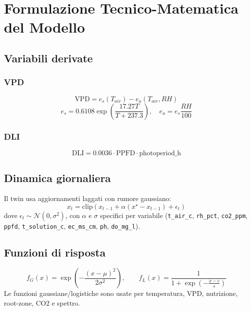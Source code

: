 ﻿\documentclass[11pt,a4paper]{report}
\begin{document}
\newpage
\chapter{Formulazione Tecnico-Matematica del Modello}

\section{Variabili derivate}
\subsection*{VPD}
\begin{equation}
\mathrm{VPD} = e_s(T_{air}) - e_a(T_{air}, RH)
\end{equation}
\begin{equation}
e_s = 0.6108\exp\left(\frac{17.27T}{T+237.3}\right), \quad e_a = e_s\frac{RH}{100}
\end{equation}

\subsection*{DLI}
\begin{equation}
\mathrm{DLI} = 0.0036 \cdot \mathrm{PPFD} \cdot \mathrm{photoperiod\_h}
\end{equation}

\section{Dinamica giornaliera}
Il twin usa aggiornamenti laggati con rumore gaussiano:
\begin{equation}
x_t = \mathrm{clip}(x_{t-1} + \alpha(x^\star - x_{t-1}) + \epsilon_t)
\end{equation}
dove \(\epsilon_t \sim \mathcal{N}(0,\sigma^2)\), con \(\alpha\) e \(\sigma\) specifici per variabile (\texttt{t\_air\_c}, \texttt{rh\_pct}, \texttt{co2\_ppm}, \texttt{ppfd}, \texttt{t\_solution\_c}, \texttt{ec\_ms\_cm}, \texttt{ph}, \texttt{do\_mg\_l}).

\section{Funzioni di risposta}
\begin{equation}
f_G(x)=\exp\left(-\frac{(x-\mu)^2}{2\sigma^2}\right), \qquad
f_L(x)=\frac{1}{1+\exp\left(-\frac{x-c}{s}\right)}
\end{equation}
Le funzioni gaussiane/logistiche sono usate per temperatura, VPD, nutrizione, root-zone, CO2 e spettro.
\end{document}
